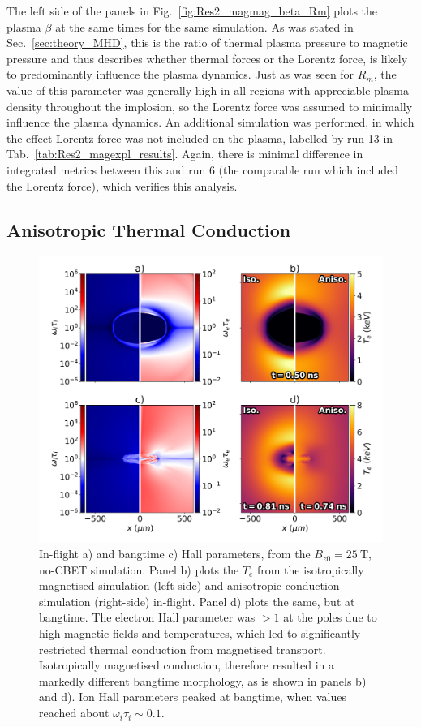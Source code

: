 The left side of the panels in Fig.~\ref{fig:Res2_magmag_beta_Rm} plots the plasma $\beta$ at the same times for the same simulation.
As was stated in Sec.~\ref{sec:theory_MHD}, this is the ratio of thermal plasma pressure to magnetic pressure and thus describes whether thermal forces or the Lorentz force, is likely to predominantly influence the plasma dynamics.
Just as was seen for $R_m$, the value of this parameter was generally high in all regions with appreciable plasma density throughout the implosion, so the Lorentz force was assumed to minimally influence the plasma dynamics.
An additional simulation was performed, in which the effect Lorentz force was not included on the plasma, labelled by run 13 in Tab.~\ref{tab:Res2_magexpl_results}.
Again, there is minimal difference in integrated metrics between this and run 6 (the comparable run which included the Lorentz force), which verifies this analysis.

\subsection{Anisotropic Thermal Conduction}%
\label{sec:Res2_aniso}

\begin{figure}[t!]
    \includegraphics[width=0.8\linewidth]{Results2/Images/iso_aniso.png}
    \centering
    \caption{In-flight a) and bangtime c) Hall parameters, from the $B_{z0}=25\ \text{T}$, no-\ac{CBET} simulation.
    Panel b) plots the $T_e$ from the isotropically magnetised simulation (left-side) and anisotropic conduction simulation (right-side) in-flight.
    Panel d) plots the same, but at bangtime.
    The electron Hall parameter was $>1$ at the poles due to high magnetic fields and temperatures, which led to significantly restricted thermal conduction from magnetised transport.
    Isotropically magnetised conduction, therefore resulted in a markedly different bangtime morphology, as is shown in panels b) and d).
    Ion Hall parameters peaked at bangtime, when values reached about $\omega_i\tau_i\sim0.1$.}%
    \label{fig:Res2_iso_aniso}
\end{figure}

